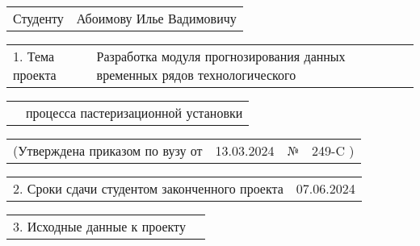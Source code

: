 \documentclass[12pt, А4, twoside]{article}
\begin{document}
\begin{FlushLeft} 
\fontsize{12}{0} 

    \begin{tabular}{p{1.9cm} p{14.95cm}}
        \textsf{Студенту} & 
        \textsf{Абоимову Илье Вадимовичу} \vspace{0pt} \hline 
    \end{tabular} 

    \vspace{-0.1 cm}

    \begin{tabular}{p{2.8cm} p{14.05cm}}
        \textsf{1. Тема проекта} & 
        \textsf{Разработка модуля прогнозирования данных временных рядов технологического} \vspace{0pt} \hline  
    \end{tabular} 

    \vspace{-0.1 cm}

    \begin{tabular}{p{2.8cm} p{14.05cm}} 
        & \textsf{процесса пастеризационной установки} \vspace{0pt} \hline 
    \end{tabular} 

    \vspace{-0.1 cm}

    \begin{tabular}{p{5.9cm} p{4.8cm} p{0.3cm} p{5.0cm}} 
        \textsf{(Утверждена приказом по вузу от} &
        \centering \textsf{13.03.2024} \vspace{1pt} \hline &
        \centering \textsf{№} &
        \centering \textsf{249-C \hspace{0.5cm} )} \hline
    \end{tabular} 

    \vspace{-0.1 cm}

    \begin{tabular}{p{9.4cm} p{7.45cm}} 
        \textsf{2. Сроки сдачи студентом законченного проекта} &
        \centering \textsf{07.06.2024} \vspace{1pt} \hline
    \end{tabular} 

    \vspace{-0.1 cm}

    \begin{tabular}{p{5.7cm} p{11.15cm}} 
        \textsf{3. Исходные данные к проекту} &
        \vspace{0pt} \hline
    \end{tabular}   


\end{FlushLeft}
\end{document}
